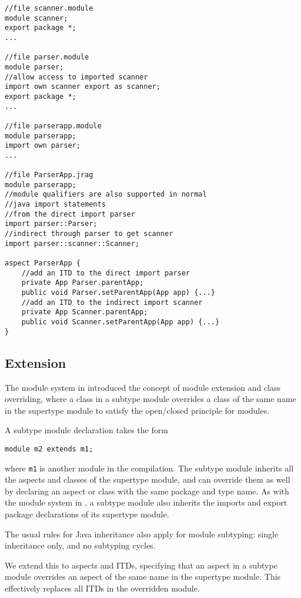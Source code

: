 \begin{lstlisting}
//file scanner.module
module scanner;
export package *;
...

//file parser.module
module parser;
//allow access to imported scanner
import own scanner export as scanner;
export package *;
...

//file parserapp.module
module parserapp;
import own parser;
...

//file ParserApp.jrag
module parserapp;
//module qualifiers are also supported in normal
//java import statements
//from the direct import parser
import parser::Parser;
//indirect through parser to get scanner
import parser::scanner::Scanner;

aspect ParserApp {
	//add an ITD to the direct import parser
	private App Parser.parentApp;
	public void Parser.setParentApp(App app) {...}
	//add an ITD to the indirect import scanner
	private App Scanner.parentApp;
	public void Scanner.setParentApp(App app) {...}
}
\end{lstlisting}

\subsection{Extension}

The module system in \cite{modulesastypes} introduced the concept of
module extension and class overriding, where a class in a subtype module
overrides a class of the same name in the supertype module to satisfy the 
open/closed principle for modules.

A subtype module declaration takes the form
\begin{lstlisting}
module m2 extends m1;
\end{lstlisting}
where \texttt{m1} is another module in the compilation. The subtype module
inherits all the aspects and classes of the supertype module, and can override
them as well by declaring an aspect or class with the same package and type name.
As with the module system in \cite{modulesastypes}, a subtype module also inherits
the imports and export package declarations of its supertype module.

The usual rules for Java inheritance also apply for module subtyping: single 
inheritance only, and no subtyping cycles.

We extend this to aspects and ITDs, specifying that an aspect in a subtype module
overrides an aspect of the same name in the supertype module. This effectively
replaces all ITDs in the overridden module.

